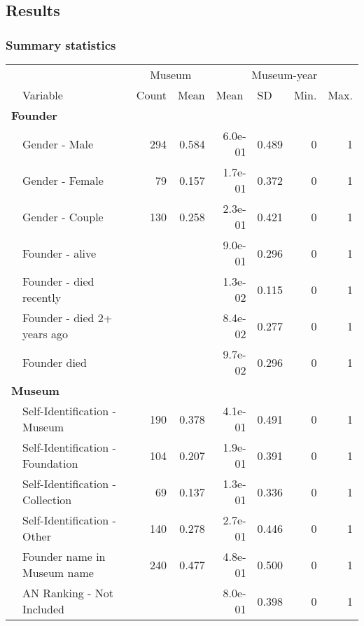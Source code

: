 \documentclass[12pt]{article}
\begin{document}
\subsection*{Results}


\subsubsection*{Summary statistics}


\begin{table}[ht]
\centering
\begin{tabular}{llrrrrrr}
  \hline
 & & \multicolumn{2}{c}{Museum} & \multicolumn{4}{c}{Museum-year} \\ 
\cmidrule(r){3-4}\cmidrule(r){5-8} \multicolumn{1}{l}{} & \multicolumn{1}{l}{Variable} & \multicolumn{1}{l}{Count} & \multicolumn{1}{l}{Mean} & \multicolumn{1}{l}{Mean} & \multicolumn{1}{l}{SD} & \multicolumn{1}{l}{Min.} & \multicolumn{1}{l}{Max.}\\ 
 \hline
  \multicolumn{8}{l}{\textbf{Founder}} \\ 
 & Gender - Male & 294 & 0.584 &  6.0e-01 &  0.489 & 0 & 1 \\ 
   & Gender - Female & 79 & 0.157 &  1.7e-01 &  0.372 & 0 & 1 \\ 
   & Gender - Couple & 130 & 0.258 &  2.3e-01 &  0.421 & 0 & 1 \\ 
   & Founder - alive &  &  &  9.0e-01 &  0.296 & 0 & 1 \\ 
   & Founder - died recently &  &  &  1.3e-02 &  0.115 & 0 & 1 \\ 
   & Founder - died 2+ years ago &  &  &  8.4e-02 &  0.277 & 0 & 1 \\ 
   & Founder died &  &  &  9.7e-02 &  0.296 & 0 & 1 \\ 
   \multicolumn{8}{l}{\textbf{Museum}} \\ 
 & Self-Identification - Museum & 190 & 0.378 &  4.1e-01 &  0.491 & 0 & 1 \\ 
   & Self-Identification - Foundation & 104 & 0.207 &  1.9e-01 &  0.391 & 0 & 1 \\ 
   & Self-Identification - Collection & 69 & 0.137 &  1.3e-01 &  0.336 & 0 & 1 \\ 
   & Self-Identification - Other & 140 & 0.278 &  2.7e-01 &  0.446 & 0 & 1 \\ 
   & Founder name in Museum name & 240 & 0.477 &  4.8e-01 &  0.500 & 0 & 1 \\ 
   & AN Ranking - Not Included &  &  &  8.0e-01 &  0.398 & 0 & 1 \\ 

\end{tabular}
\end{table}
\end{document}
